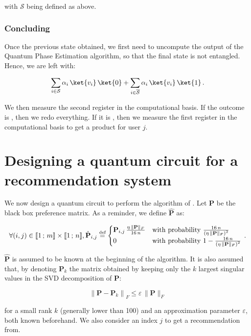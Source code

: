 \documentclass[11pt, a4paper]{article}
\begin{document}
                with \(\mathcal{S}\) being defined as above.
            \subsubsection{Concluding}
                Once the previous state obtained, we first need to uncompute the output of the Quantum Phase Estimation algorithm, so that the final state is not entangled. Hence, we are left with:
                
                \[\sum_{i\in\mathcal{S}}\alpha_i\,\ket{v_i}\,\ket{0} + \sum_{i\in\overline{\mathcal{S}}}\alpha_i\,\ket{v_i}\,\ket{1}\,.\]
                
                We then measure the second register in the computational basis. If the outcome is , then we redo everything. If it is , then we measure the first register in the computational basis to get a product for user \(j\).
                
    \section{Designing a quantum circuit for a recommendation system}
        \label{sec:QCircuit}
        We now design a quantum circuit to perform the algorithm of \citeauthor{QRS}. Let \(\mathbf{P}\) be the black box preference matrix. As a reminder, we define \(\hat{\mathbf{P}}\) as:
        
        \[\forall(i, j)\in\llbracket1\,;\,m\rrbracket\times\llbracket1\,;\,n\rrbracket,\hat{\mathbf{P}}_{i,j}\overset{\text{\tiny{def}}}{=}\begin{cases}\mathbf{P}_{i,j}\,\frac{\eta\,\|\mathbf{P}\|_F}{16\,n}&\text{with probability } \frac{16\,n}{\left(\eta\,\|\mathbf{P}\|_F\right)^2}\\0&\text{with probability } 1-\frac{16\,n}{\left(\eta\,\|\mathbf{P}\|_F\right)^2}\end{cases}\,.\]
        
        \(\hat{\mathbf{P}}\) is assumed to be known at the beginning of the algorithm. It is also assumed that, by denoting \(\mathbf{P}_k\) the matrix obtained by keeping only the \(k\) largest singular values in the SVD decomposition of \(\mathbf{P}\):
        
        \[\left\|\mathbf{P}-\mathbf{P}_k\right\|_F\leqslant\varepsilon\,\|\mathbf{P}\|_F\]
        
        for a small rank \(k\) (generally lower than 100) and an approximation parameter \(\varepsilon\), both known beforehand. We also consider an index \(j\) to get a recommendation from.
        
\end{document}
